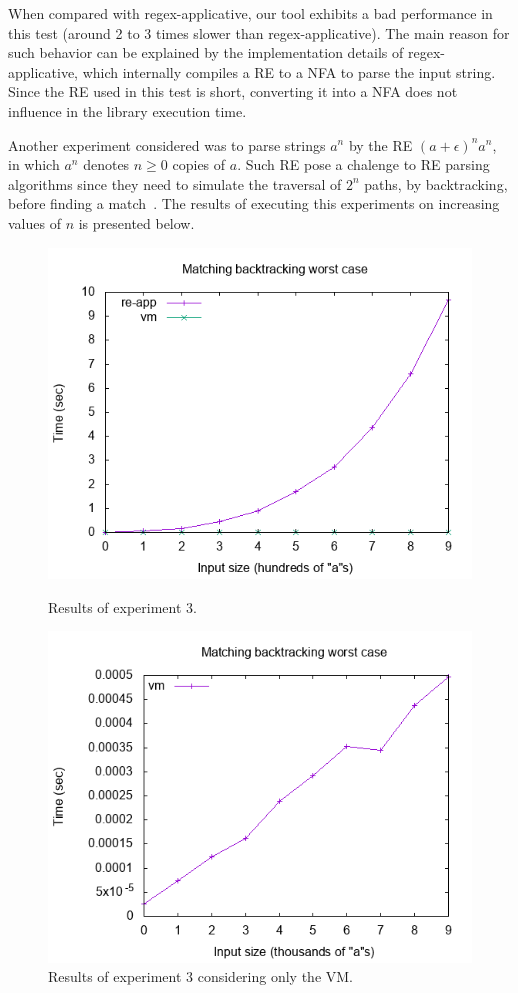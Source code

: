 \documentclass[oneside,12pt]{scrbook}
\renewcommand{\geq}{\geqslant}
\theoremstyle{definition}
\theoremstyle{plain}
\theoremstyle{definition}
\begin{document}
When compared with regex-applicative, our tool exhibits a bad performance in
this test (around 2 to 3 times slower than regex-applicative). The main reason for 
such behavior can be explained by the implementation details of
regex-applicative,  which internally compiles a RE 
to a NFA to parse the input string. Since the RE used in this test is short,
converting it into a NFA does not influence in the library execution time.


Another experiment considered was to parse strings $a^n$ by the RE $(a +
\epsilon)^na^n$, in which $a^n$ denotes $n \geq 0$ copies of $a$. Such RE pose a 
chalenge to RE parsing algorithms since they need to simulate the traversal of
$2^n$ paths, by backtracking, before finding a match~\cite{Lasse2011}. The
results of executing this experiments on increasing values of $n$ is presented 
below.


\begin{figure}[h]
\centering
\begin{minipage}{0.45\textwidth}
	\includegraphics[width=.9\textwidth]{backtrack.png}
	\caption{Results of experiment 3.}
	\label{fig:graph3}
\end{minipage} \hfill
\begin{minipage}{0.45\textwidth}
	\includegraphics[width=.9\textwidth]{backtrack1.png}
	\caption{Results of experiment 3 considering only the VM.}
	\label{fig:graph4}
\end{minipage}
\end{figure}
\end{document}
